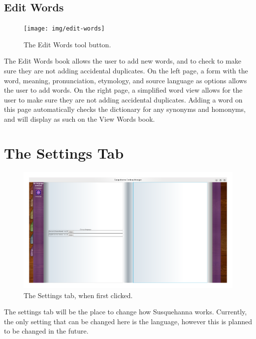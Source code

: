 \documentclass{report}
\begin{document}
	\section{Edit Words}
	\begin{figure}
		\centering
		\texttt{[image: img/edit-words]}
		\caption{The Edit Words tool button.}
		\label{fig:edit-words}
	\end{figure}
	The Edit Words book allows the user to add new words, and to check to make sure they are not adding accidental duplicates. On the left page, a form with the word, meaning, pronunciation, etymology, and source language as options allows the user to add words. On the right page, a simplified word view allows for the user to make sure they are not adding accidental duplicates. Adding a word on this page automatically checks the dictionary for any synonyms and homonyms, and will display as such on the View Words book.
	
	\chapter{The Settings Tab}
	\begin{figure}[ht]
		\centering
		\includegraphics[width=1\linewidth]{img/settings-tab}
		\caption{The Settings tab, when first clicked.}
		\label{fig:settings-tab}
	\end{figure}
	The settings tab will be the place to change how Susquehanna works. Currently, the only setting that can be changed here is the language, however this is planned to be changed in the future.
	\newpage
\end{document}

